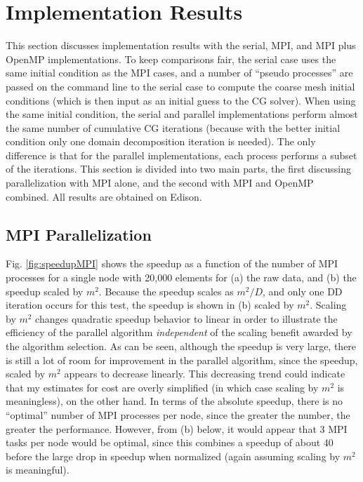 \documentclass[10pt]{article}
\begin{document}
\section{Implementation Results}
This section discusses implementation results with the serial, MPI, and MPI plus OpenMP implementations. To keep comparisons fair, the serial case uses the same initial condition as the MPI cases, and a number of ``pseudo processes'' are passed on the command line to the serial case to compute the coarse mesh initial conditions (which is then input as an initial guess to the CG solver). When using the same initial condition, the serial and parallel implementations perform almost the same number of cumulative CG iterations (because with the better initial condition only one domain decomposition iteration is needed). The only difference is that for the parallel implementations, each process performs a subset of the iterations. This section is divided into two main parts, the first discussing parallelization with MPI alone, and the second with MPI and OpenMP combined. All results are obtained on Edison.

\subsection{MPI Parallelization}

Fig. \ref{fig:speedupMPI} shows the speedup as a function of the number of MPI processes for a single node with 20,000 elements for (a) the raw data, and (b) the speedup scaled by \(m^2\). Because the speedup scales as \(m^2/D\), and only one DD iteration occurs for this test, the speedup is shown in (b) scaled by \(m^2\). Scaling by \(m^2\) changes quadratic speedup behavior to linear in order to illustrate the efficiency of the parallel algorithm {\it independent} of the scaling benefit awarded by the algorithm selection. As can be seen, although the speedup is very large, there is still a lot of room for improvement in the parallel algorithm, since the speedup, scaled by \(m^2\) appears to decrease linearly. This decreasing trend could indicate that my estimates for cost are overly simplified (in which case scaling by \(m^2\) is meaningless), on the other hand. In terms of the absolute speedup, there is no ``optimal'' number of MPI processes per node, since the greater the number, the greater the performance. However, from (b) below, it would appear that 3 MPI tasks per node would be optimal, since this combines a speedup of about 40 before the large drop in speedup when normalized (again assuming scaling by \(m^2\) is meaningful). 
\end{document}
